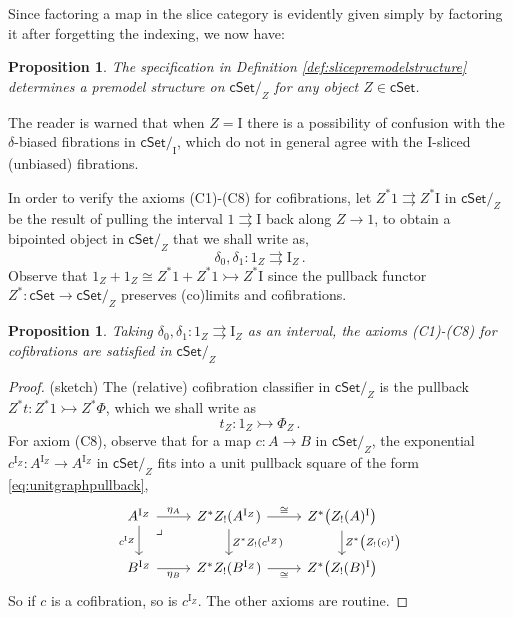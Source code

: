 \documentclass[11pt,reqno]{amsart}
\newcommand{\cSet}{\ensuremath{\mathsf{cSet}}}
\newcommand{\cSetZ}{\ensuremath{\mathsf{cSet}/_{\!Z}}}
\newcommand{\slice}[1]{\ensuremath{/_{\!{#1}}}}
\newcommand{\cof}{\ensuremath{\rightarrowtail}}
\renewcommand{\to}{\ensuremath{\rightarrow}}
\newcommand{\I}{\ensuremath{\mathrm{I}}}
\newtheorem{proposition}[theorem]{Proposition}
\theoremstyle{remark}
\theoremstyle{definition}
\newcommand{\pbmark}{\ar[dr, phantom, "\lrcorner" very near start, shift right=.5ex]}	%
\begin{document}
Since factoring a map in the slice category is evidently given simply by factoring it after forgetting the indexing, we now have:

\begin{proposition}\label{prop:slicepremodelstructure}
The specification in Definition \ref{def:slicepremodelstructure} determines a premodel structure on $\cSetZ$ for any object $Z \in \cSet$.
\end{proposition}

The reader is warned that when $Z = \I$ there is a possibility of confusion with the $\delta$-biased fibrations in $\cSet\slice{\I}$, which do not in general agree with the $\I$-sliced (unbiased) fibrations.  

In order to verify the axioms (C1)-(C8) for cofibrations, let $Z^*1 \rightrightarrows Z^*\I$ in $\cSetZ$ be the result of pulling the interval $1 \rightrightarrows \I$ back along $Z\to 1$, to obtain a bipointed object in $\cSetZ$ that we shall write as,
\begin{equation}\label{eq:relativeinterval}
\delta_0, \delta_1 : 1_Z \rightrightarrows \I_Z\,.
\end{equation}
Observe that $1_Z + 1_Z \cong Z^*1 + Z^*1 \cof Z^*\I$ since the pullback functor  $Z^* : \cSet\to \cSetZ$ preserves (co)limits and cofibrations.   

\begin{proposition}
Taking $\delta_0, \delta_1 : 1_Z \rightrightarrows \I_Z$ as an interval, the axioms  (C1)-(C8) for cofibrations are satisfied in $\cSetZ$ 
\end{proposition}

\begin{proof}(sketch)
The (relative) cofibration classifier in $\cSetZ$ is the pullback $Z^*t : Z^*1 \cof Z^*\Phi$, which we shall write as
\begin{equation}\label{eq:relativecofclassifier}
t_Z : 1_Z \cof \Phi_Z\,.
\end{equation}
For axiom (C8), observe that for a map $c : A \to B$ in $\cSetZ$, the exponential $c^{\I_Z} : A^{\I_Z}  \to A^{\I_Z} $ in $\cSetZ$ fits into a unit pullback square of the form \eqref{eq:unitgraphpullback},
\begin{equation}\label{eq:unitgraphpullback2}
\begin{tikzcd}
A^{\I_Z}  \ar[d,swap, "c^{\I_Z}"] \ar[r, "\eta_A" ] \pbmark & Z^*Z_!(A^{\I_Z})   \ar[d, "Z^*Z_!(c^{\I_Z})"] \ar[r, "\cong"] 
	& Z^*\big(Z_!(A)^{\I} \big) \ar[d, "Z^*\big(Z_!(c)^{\I} \big)"] \\  
B^{\I_Z}   \ar[r, swap, "\eta_B" ]   & Z^*Z_!(B^{\I_Z})   \ar[r,swap, "\cong"] & Z^*\big(Z_!(B)^{\I} \big)
 \end{tikzcd}
 \end{equation}
So if $c$ is a cofibration, so is $c^{\I_Z}$.
The other axioms are routine.
\end{proof}
\end{document}

